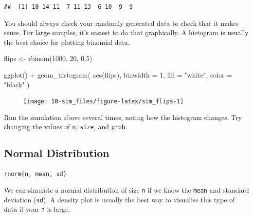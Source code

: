 \documentclass[
  oneside]{book}
\newenvironment{Shaded}{\begin{snugshade}}{\end{snugshade}}
\newcommand{\AttributeTok}[1]{\textcolor[rgb]{0.77,0.63,0.00}{#1}}
\newcommand{\DecValTok}[1]{\textcolor[rgb]{0.00,0.00,0.81}{#1}}
\newcommand{\FloatTok}[1]{\textcolor[rgb]{0.00,0.00,0.81}{#1}}
\newcommand{\FunctionTok}[1]{\textcolor[rgb]{0.00,0.00,0.00}{#1}}
\newcommand{\NormalTok}[1]{#1}
\newcommand{\OtherTok}[1]{\textcolor[rgb]{0.56,0.35,0.01}{#1}}
\newcommand{\SpecialCharTok}[1]{\textcolor[rgb]{0.00,0.00,0.00}{#1}}
\newcommand{\StringTok}[1]{\textcolor[rgb]{0.31,0.60,0.02}{#1}}
\begin{document}
\begin{verbatim}
##  [1] 10 14 11  7 11 13  6 10  9  9
\end{verbatim}

You should always check your randomly generated data to check that it makes sense. For large samples, it's easiest to do that graphically. A histogram is usually the best choice for plotting binomial data.

\begin{Shaded}
\begin{Highlighting}[]
\NormalTok{flips }\OtherTok{\textless{}{-}} \FunctionTok{rbinom}\NormalTok{(}\DecValTok{1000}\NormalTok{, }\DecValTok{20}\NormalTok{, }\FloatTok{0.5}\NormalTok{)}

\FunctionTok{ggplot}\NormalTok{() }\SpecialCharTok{+}
  \FunctionTok{geom\_histogram}\NormalTok{(}
    \FunctionTok{aes}\NormalTok{(flips), }
    \AttributeTok{binwidth =} \DecValTok{1}\NormalTok{, }
    \AttributeTok{fill =} \StringTok{"white"}\NormalTok{, }
    \AttributeTok{color =} \StringTok{"black"}
\NormalTok{  )}
\end{Highlighting}
\end{Shaded}

\begin{figure}

{\centering \texttt{[image: 10-sim\_files/figure-latex/sim\_flips-1]} 

}

\end{figure}

\begin{try}
Run the simulation above several times, noting how the histogram changes. Try changing the values of \texttt{n}, \texttt{size}, and \texttt{prob}.

\end{try}

\hypertarget{normal}{%
\subsection{Normal Distribution}\label{normal}}

\texttt{rnorm(n,\ mean,\ sd)}

We can simulate a normal distribution of size \texttt{n} if we know the \texttt{mean} and standard deviation (\texttt{sd}). A density plot is usually the best way to visualise this type of data if your \texttt{n} is large.
\end{document}
